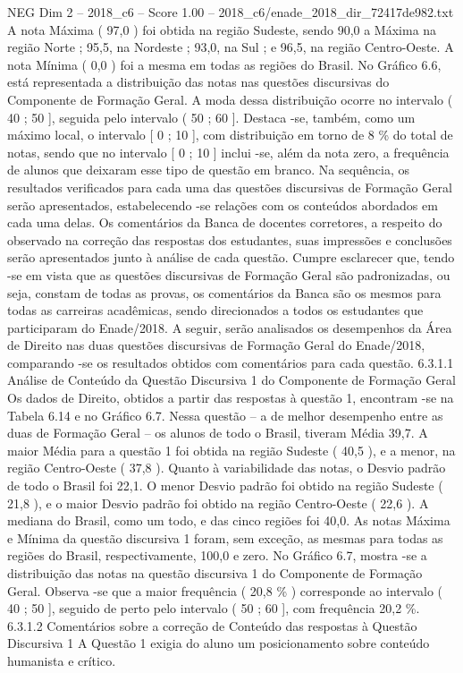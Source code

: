 \begin{textsample}{NEG Dim 2 – 2018\_c6 – Score 1.00 – 2018\_c6/enade\_2018\_dir\_72417de982.txt}
A nota Máxima ( 97,0 ) foi obtida na região Sudeste, sendo 90,0 a Máxima na região Norte ; 95,5, na Nordeste ; 93,0, na Sul ; e 96,5, na região Centro-Oeste.
A nota Mínima ( 0,0 ) foi a mesma em todas as regiões do Brasil.
No Gráfico 6.6, está representada a distribuição das notas nas questões discursivas do Componente de Formação Geral.
A moda dessa distribuição ocorre no intervalo ( 40 ; 50 ], seguida pelo intervalo ( 50 ; 60 ].
Destaca -se, também, como um máximo local, o intervalo [ 0 ; 10 ], com distribuição em torno de 8 \% do total de notas, sendo que no intervalo [ 0 ; 10 ] inclui -se, além da nota zero, a frequência de alunos que deixaram esse tipo de questão em branco.
Na sequência, os resultados verificados para cada uma das questões discursivas de Formação Geral serão apresentados, estabelecendo -se relações com os conteúdos abordados em cada uma delas.
Os comentários da Banca de docentes corretores, a respeito do observado na correção das respostas dos estudantes, suas impressões e conclusões serão apresentados junto à análise de cada questão.
Cumpre esclarecer que, tendo -se em vista que as questões discursivas de Formação Geral são padronizadas, ou seja, constam de todas as provas, os comentários da Banca são os mesmos para todas as carreiras acadêmicas, sendo direcionados a todos os estudantes que participaram do Enade/2018.
A seguir, serão analisados os desempenhos da Área de Direito nas duas questões discursivas de Formação Geral do Enade/2018, comparando -se os resultados obtidos com comentários para cada questão. 6.3.1.1 Análise de Conteúdo da Questão Discursiva 1 do Componente de Formação Geral Os dados de Direito, obtidos a partir das respostas à questão 1, encontram -se na Tabela 6.14 e no Gráfico 6.7.
Nessa questão – a de melhor desempenho entre as duas de Formação Geral – os alunos de todo o Brasil, tiveram Média 39,7.
A maior Média para a questão 1 foi obtida na região Sudeste ( 40,5 ), e a menor, na região Centro-Oeste ( 37,8 ).
Quanto à variabilidade das notas, o Desvio padrão de todo o Brasil foi 22,1.
O menor Desvio padrão foi obtido na região Sudeste ( 21,8 ), e o maior Desvio padrão foi obtido na região Centro-Oeste ( 22,6 ).
A mediana do Brasil, como um todo, e das cinco regiões foi 40,0.
As notas Máxima e Mínima da questão discursiva 1 foram, sem exceção, as mesmas para todas as regiões do Brasil, respectivamente, 100,0 e zero.
No Gráfico 6.7, mostra -se a distribuição das notas na questão discursiva 1 do Componente de Formação Geral.
Observa -se que a maior frequência ( 20,8 \% ) corresponde ao intervalo ( 40 ; 50 ], seguido de perto pelo intervalo ( 50 ; 60 ], com frequência 20,2 \%. 6.3.1.2 Comentários sobre a correção de Conteúdo das respostas à Questão Discursiva 1 A Questão 1 exigia do aluno um posicionamento sobre conteúdo humanista e crítico.

\end{textsample}

